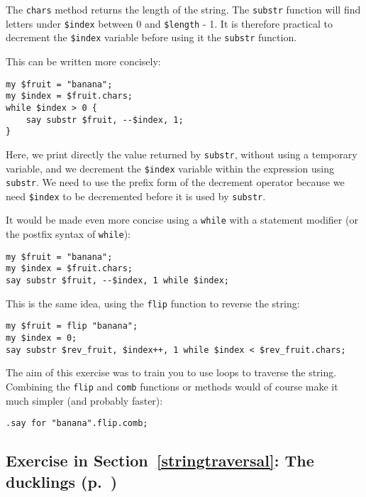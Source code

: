 The {\tt chars} method returns the length of the string. The 
{\tt substr} function will find letters under \verb'$index' 
between 0 and \verb'$length' - 1. It is therefore practical 
to decrement the \verb'$index' variable before using it the
{\tt substr} function. 

This can be written more concisely:

\begin{verbatim}
my $fruit = "banana";
my $index = $fruit.chars;
while $index > 0 { 
    say substr $fruit, --$index, 1; 
}
\end{verbatim}
%

Here, we print directly the value returned by {\tt substr}, 
without using a temporary variable, and we decrement the 
\verb'$index' variable within the expression using {\tt substr}.
We need to use the prefix form of the decrement operator 
because we need \verb'$index' to be decremented before it is 
used by {\tt substr}.

It would be made even more concise using a {\tt while} with 
a statement modifier (or the postfix syntax of {\tt while}):

\begin{verbatim}
my $fruit = "banana";
my $index = $fruit.chars;
say substr $fruit, --$index, 1 while $index;
\end{verbatim}
%

This is the same idea, using the {\tt flip} function to 
reverse the string:

\begin{verbatim}
my $fruit = flip "banana";
my $index = 0;
say substr $rev_fruit, $index++, 1 while $index < $rev_fruit.chars;
\end{verbatim}
%

The aim of this exercise was to train you to use loops to 
traverse the string. Combining the {\tt flip} and {\tt comb} 
functions or methods would of course make it much simpler (and 
probably faster):

\begin{verbatim}
.say for "banana".flip.comb;
\end{verbatim}


\subsection{Exercise in Section~\ref{stringtraversal}: The ducklings (p.~\pageref{stringtraversal})}
\label{sol_ducklings}

